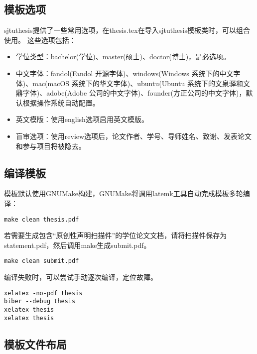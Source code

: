 \subsection{模板选项}
\label{sec:thesisoption}

sjtuthesis提供了一些常用选项，在thesis.tex在导入sjtuthesis模板类时，可以组合使用。
这些选项包括：

\begin{itemize}[noitemsep,topsep=0pt,parsep=0pt,partopsep=0pt]
	\item 学位类型：bachelor(学位)、master(硕士)、doctor(博士)，是必选项。
	\item 中文字体：fandol(Fandol 开源字体)、windows(Windows 系统下的中文字体)、mac(macOS 系统下的华文字体)、ubuntu(Ubuntu 系统下的文泉驿和文鼎字体)、adobe(Adobe 公司的中文字体)、founder(方正公司的中文字体)，默认根据操作系统自动配置。
	\item 英文模版：使用english选项启用英文模版。
	\item 盲审选项：使用review选项后，论文作者、学号、导师姓名、致谢、发表论文和参与项目将被隐去。
\end{itemize}

\subsection{编译模板}
\label{sec:process}

模板默认使用GNUMake构建，GNUMake将调用latemk工具自动完成模板多轮编译：

\begin{lstlisting}[basicstyle=\small\ttfamily, caption={编译模板}, numbers=none]
make clean thesis.pdf
\end{lstlisting}

若需要生成包含“原创性声明扫描件”的学位论文文档，请将扫描件保存为statement.pdf，然后调用make生成submit.pdf。

\begin{lstlisting}[basicstyle=\small\ttfamily, caption={生成用于提交的学位论文}, numbers=none]
make clean submit.pdf
\end{lstlisting}

编译失败时，可以尝试手动逐次编译，定位故障。

\begin{lstlisting}[basicstyle=\small\ttfamily, caption={手动逐次编译}, numbers=none]
xelatex -no-pdf thesis
biber --debug thesis
xelatex thesis
xelatex thesis
\end{lstlisting}

\subsection{模板文件布局}
\label{sec:layout}

